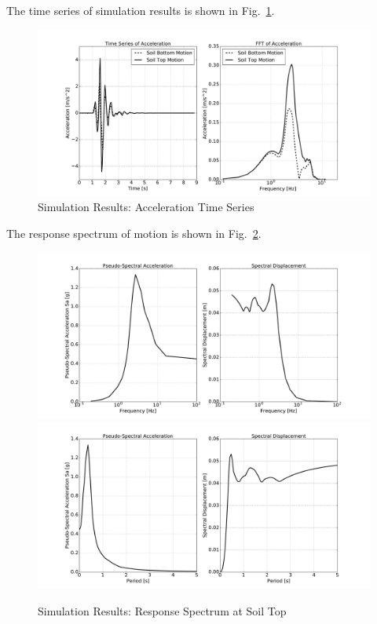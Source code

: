 The time series of simulation results is shown in Fig.~\ref{fig_decon_3D_motion_1D_model_results_top_bottom_time_series_fr3d}.
\begin{figure}[H]
  \centering
  \includegraphics[width = 15cm]{./Figure-files/nonlinear_analysis_steps/free_field_3D/DRM3D_motion_node_4454_x_acce_compare.pdf}
  \caption{Simulation Results: Acceleration Time Series }
  \label{fig_decon_3D_motion_1D_model_results_top_bottom_time_series_fr3d}
\end{figure}

The response spectrum of motion is shown in Fig.~\ref{fig_spectrum_freq_period_time_series_fr3d}.
\begin{figure}[H]
  \centering
  \includegraphics[width = 15cm]{./Figure-files/nonlinear_analysis_steps/free_field_3D/DRM3D_motion_node_4454_x_spectrum_freq.pdf}
  \includegraphics[width = 15cm]{./Figure-files/nonlinear_analysis_steps/free_field_3D/DRM3D_motion_node_4454_x_spectrum_period.pdf}
  \caption{Simulation Results: Response Spectrum at Soil Top}
  \label{fig_spectrum_freq_period_time_series_fr3d}
\end{figure}


